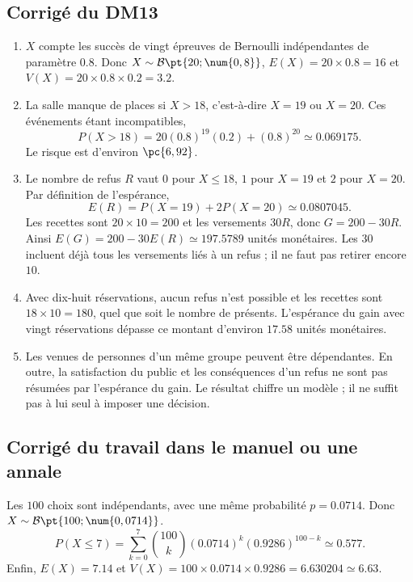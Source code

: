 \subsection{Corrigé du DM13}\begin{enumerate}
\item $X$ compte les succès de vingt épreuves de Bernoulli indépendantes de paramètre $\num{0,8}$. Donc $X\sim\mathcal B\pt{20;\num{0,8}}$, $E(X)=20\times\num{0,8}=16$ et $V(X)=20\times\num{0,8}\times\num{0,2}=\num{3,2}$.
\item La salle manque de places si $X>18$, c'est-à-dire $X=19$ ou $X=20$. Ces événements étant incompatibles,
\[P(X>18)=20(\num{0,8})^{19}(\num{0,2})+(\num{0,8})^{20}\simeq\num{0,069175}.\]
Le risque est d'environ $\pc{6,92}$.
\item Le nombre de refus $R$ vaut $0$ pour $X\le18$, $1$ pour $X=19$ et $2$ pour $X=20$. Par définition de l'espérance,
\[E(R)=P(X=19)+2P(X=20)\simeq\num{0,0807045}.\]
Les recettes sont $20\times10=200$ et les versements $30R$, donc $G=200-30R$. Ainsi $E(G)=200-30E(R)\simeq\num{197,5789}$ unités monétaires. Les $30$ incluent déjà tous les versements liés à un refus ; il ne faut pas retirer encore $10$.
\item Avec dix-huit réservations, aucun refus n'est possible et les recettes sont $18\times10=180$, quel que soit le nombre de présents. L'espérance du gain avec vingt réservations dépasse ce montant d'environ $\num{17,58}$ unités monétaires.
\item Les venues de personnes d'un même groupe peuvent être dépendantes. En outre, la satisfaction du public et les conséquences d'un refus ne sont pas résumées par l'espérance du gain. Le résultat chiffre un modèle ; il ne suffit pas à lui seul à imposer une décision.
\end{enumerate}

\subsection{Corrigé du travail dans le manuel ou une annale}Les $100$ choix sont indépendants, avec une même probabilité $p=\num{0,0714}$. Donc $X\sim\mathcal B\pt{100;\num{0,0714}}$.
\[P(X\le7)=\sum_{k=0}^7\binom{100}k(\num{0,0714})^k(\num{0,9286})^{100-k}\simeq\num{0,577}.\]
Enfin, $E(X)=\num{7,14}$ et $V(X)=100\times\num{0,0714}\times\num{0,9286}=\num{6,630204}\simeq\num{6,63}$.

\fi

